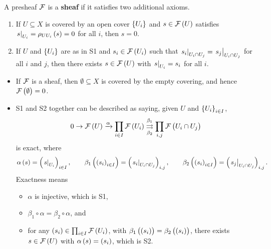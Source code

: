 \begin{definition*}
A presheaf $ \mathcal{F} $ is a \textbf{sheaf} if it satisfies two additional axioms.
\begin{enumerate}[label=S\arabic*.]
\item If $ U \subseteq X $ is covered by an open cover $ \cbr{U_i} $ and $ s \in \FFF\br{U} $ satisfies $ \eval{s}_{U_i} = \rho_{UU_i}\br{s} = 0 $ for all $ i $, then $ s = 0 $.
\item If $ U $ and $ \cbr{U_i} $ are as in S1 and $ s_i \in \FFF\br{U_i} $ such that $ \left. s_i \right|_{U_i \cap U_j} = \left. s_j \right|_{U_i \cap U_j} $ for all $ i $ and $ j $, then there exists $ s \in \FFF\br{U} $ with $ \left. s \right|_{U_i} = s_i $ for all $ i $.
\end{enumerate}
\end{definition*}

\begin{remark*}
\hfill
\begin{itemize}
\item If $ \mathcal{F} $ is a sheaf, then $ \emptyset \subseteq X $ is covered by the empty covering, and hence $ \FFF\br{\emptyset} = 0 $.
\item S1 and S2 together can be described as saying, given $ U $ and $ \cbr{U_i}_{i \in I} $,
$$ 0 \to \FFF\br{U} \xrightarrow{\alpha} \prod_{i \in I} \FFF\br{U_i} \overset{\beta_1}{\underset{\beta_2}{\rightrightarrows}} \prod_{i, j} \FFF\br{U_i \cap U_j} $$
is exact, where
$$ \alpha\br{s} = \br{\eval{s}_{U_i}}_{i \in I}, \qquad \beta_1\br{\br{s_i}_{i \in I}} = \br{\eval{s_i}_{U_i \cap U_j}}_{i, j}, \qquad \beta_2\br{\br{s_i}_{i \in I}} = \br{\eval{s_j}_{U_i \cap U_j}}_{i, j}. $$
Exactness means
\begin{itemize}
\item $ \alpha $ is injective, which is S1,
\item $ \beta_1 \circ \alpha = \beta_2 \circ \alpha $, and
\item for any $ \br{s_i} \in \prod_{i \in I} \FFF\br{U_i} $, with $ \beta_1\br{\br{s_i}} = \beta_2\br{\br{s_i}} $, there exists $ s \in \FFF\br{U} $ with $ \alpha\br{s} = \br{s_i} $, which is S2.
\end{itemize}
\end{itemize}
\end{remark*}

\pagebreak


